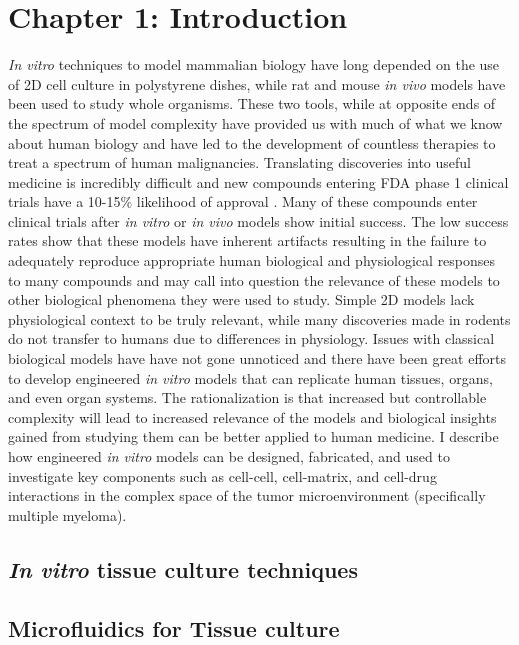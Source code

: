 \chapter{Chapter 1: Introduction}\label{Chap:Introduction}
\textit{In vitro} techniques to model mammalian biology have long depended on the use of 2D cell culture in polystyrene dishes, while rat and mouse \textit{in vivo} models have been used to study whole organisms. These two tools, while at opposite ends of the spectrum of model complexity have provided us with much of what we know about human biology and have led to the development of countless therapies to treat a spectrum of human malignancies. Translating discoveries into useful medicine is incredibly difficult and new compounds entering FDA phase 1 clinical trials have a 10-15\% likelihood of approval \cite{Hay2014ClinicalDrugs}. Many of these compounds enter clinical trials after \textit{in vitro} or \textit{in vivo} models show initial success. The low success rates show that these models have inherent artifacts resulting in the failure to adequately reproduce appropriate human biological and physiological responses to many compounds and may call into question the relevance of these models to other biological phenomena they were used to study. Simple 2D models lack physiological context to be truly relevant, while many discoveries made in rodents do not transfer to humans due to differences in physiology. Issues with classical biological models have have not gone unnoticed and there have been great efforts to develop engineered \textit{in vitro} models that can replicate human tissues, organs, and even organ systems. The rationalization is that increased but controllable complexity will lead to increased relevance of the models and biological insights gained from studying them can be better applied to human medicine. I describe how engineered \textit{in vitro} models can be designed, fabricated, and used to investigate key components such as cell-cell, cell-matrix, and cell-drug interactions in the complex space of the tumor microenvironment (specifically multiple myeloma).  

\section{\textit{In vitro} tissue culture techniques}



\section{Microfluidics for Tissue culture}

